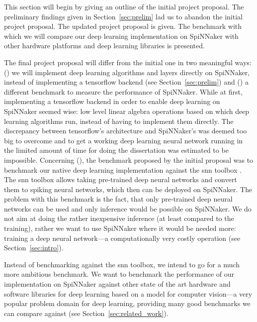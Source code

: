 \documentclass{article}
\begin{document}
This section will begin by giving an outline of the initial
project proposal.
The preliminary findings given in Section~\ref{sec:prelim}
lad us to abandon the initial project proposal.
The updated project proposal is given.
The benchmark with which we will compare our deep learning
implementation on SpiNNaker with other hardware platforms
and deep learning libraries is presented.

The final project proposal will differ from the initial one
in two meaningful ways: () we will implement
deep learning algorithms and layers directly on SpiNNaker,
instead of implementing a tensorflow backend (see
Section~\ref{sec:prelim}) and () a different
benchmark to measure the performance of SpiNNaker.
While at first, implementing a tensorflow backend in order
to enable deep learning on SpiNNaker seemed wise: low
level linear algebra operations based on which deep
learning algorithms run, instead of having to implement
them directly.
The discrepancy between tensorflow's architecture and
SpiNNaker's was deemed too big to overcome and to get a
working deep learning neural network running in the limited
amount of time for doing the dissertation was estimated to
be impossible.
Concerning (), the benchmark proposed by the
initial proposal was to benchmark our native deep learning
implementation against the snn toolbox
\citep{rueckauer_et_al_2017}.
The snn toolbox allows taking pre-trained deep neural
networks and convert them to spiking neural networks, which
then can be deployed on SpiNNaker.
The problem with this benchmark is the fact, that only
pre-trained deep neural networks can be used and only
inference would be possible on SpiNNaker.
We do not aim at doing the rather inexpensive inference
(at least compared to the training), rather we want to
use SpiNNaker where it would be needed more: training
a deep neural network---a computationally very costly
operation (see Section~\ref{sec:intro}).

Instead of benchmarking against the snn toolbox, we intend
to go for a much more ambitious benchmark.
We want to benchmark the performance of our implementation
on SpiNNaker against other state of the art hardware and
software libraries for deep learning based on a model for
computer vision---a very popular problem domain for deep
learning, providing many good benchmarks we can compare
against (see Section~\ref{sec:related_work}).
\end{document}
